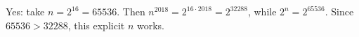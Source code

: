 Yes: take $n=2^{16}=65536$. Then $n^{2018}=2^{16\cdot2018}=2^{32288}$, while $2^n=2^{65536}$. Since $65536>32288$, this explicit $n$ works.
